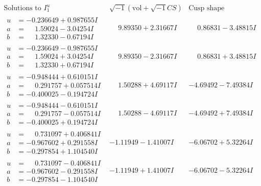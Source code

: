 \documentclass[1p]{elsarticle_modified}
\theoremstyle{definition}
\newcommand{\I}{\sqrt{-1}}
\begin{document}
$$\begin{array}{c|c|c}  
\text{Solutions to }I^u_{1}& \I (\text{vol} + \sqrt{-1}CS) & \text{Cusp shape}\\
 \hline 
\begin{aligned}
u &= -0.236649 + 0.987655 I \\
a &= \phantom{-}1.59024 - 3.04254 I \\
b &= \phantom{-}1.32330 - 0.67194 I\end{aligned}
 & \phantom{-}9.89350 + 2.31667 I & \phantom{-}0.86831 - 3.48815 I \\ \hline\begin{aligned}
u &= -0.236649 - 0.987655 I \\
a &= \phantom{-}1.59024 + 3.04254 I \\
b &= \phantom{-}1.32330 + 0.67194 I\end{aligned}
 & \phantom{-}9.89350 - 2.31667 I & \phantom{-}0.86831 + 3.48815 I \\ \hline\begin{aligned}
u &= -0.948444 + 0.610151 I \\
a &= \phantom{-}0.291757 + 0.057514 I \\
b &= -0.400025 - 0.194724 I\end{aligned}
 & \phantom{-}1.50288 + 4.69117 I & -4.69492 - 7.49384 I \\ \hline\begin{aligned}
u &= -0.948444 - 0.610151 I \\
a &= \phantom{-}0.291757 - 0.057514 I \\
b &= -0.400025 + 0.194724 I\end{aligned}
 & \phantom{-}1.50288 - 4.69117 I & -4.69492 + 7.49384 I \\ \hline\begin{aligned}
u &= \phantom{-}0.731097 + 0.406841 I \\
a &= -0.967602 + 0.291558 I \\
b &= -0.297854 + 1.104540 I\end{aligned}
 & -1.11949 - 1.41007 I & -6.06702 + 5.32264 I \\ \hline\begin{aligned}
u &= \phantom{-}0.731097 - 0.406841 I \\
a &= -0.967602 - 0.291558 I \\
b &= -0.297854 - 1.104540 I\end{aligned}
 & -1.11949 + 1.41007 I & -6.06702 - 5.32264 I \\ \hline\begin{aligned}

\end{aligned}
\end{array}$$
\end{document}
